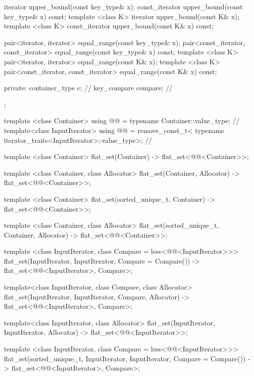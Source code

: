 \begin{codeblock}
\begin{codeblock}
\begin{codeblock}
\begin{addedblock}
\begin{codeblock}
{{    iterator upper_bound(const key_type& x);
    const_iterator upper_bound(const key_type& x) const;
    template <class K> iterator upper_bound(const K& x);
    template <class K> const_iterator upper_bound(const K& x) const;

    pair<iterator, iterator> equal_range(const key_type& x);
    pair<const_iterator, const_iterator> equal_range(const key_type& x) const;
    template <class K>
      pair<iterator, iterator> equal_range(const K& x);
    template <class K>
      pair<const_iterator, const_iterator> equal_range(const K& x) const;

  private:
      container_type c;    // \expos
      key_compare compare; // \expos
  };

  template <class Container>
    using @@ = typename Container::value_type; // \expos
  template<class InputIterator>
    using @@ = remove_const_t<
      typename iterator_traits<InputIterator>::value_type>;     // \expos

  template <class Container>
    flat_set(Container)
      -> flat_set<@@<Container>>;

  template <class Container, class Allocator>
    flat_set(Container, Allocator)
      -> flat_set<@@<Container>>;

  template <class Container>
    flat_set(sorted_unique_t, Container)
      -> flat_set<@@<Container>>;

  template <class Container, class Allocator>
    flat_set(sorted_unique_t, Container, Allocator)
      -> flat_set<@@<Container>>;

  template <class InputIterator, class Compare = less<@@<InputIterator>>>
    flat_set(InputIterator, InputIterator, Compare = Compare())
      -> flat_set<@@<InputIterator>, Compare>;

  template<class InputIterator, class Compare, class Allocator>
    flat_set(InputIterator, InputIterator, Compare, Allocator)
      -> flat_set<@@<InputIterator>, Compare>;

  template<class InputIterator, class Allocator>
    flat_set(InputIterator, InputIterator, Allocator)
      -> flat_set<@@<InputIterator>>;

  template <class InputIterator, class Compare = less<@@<InputIterator>>>
    flat_set(sorted_unique_t, InputIterator, InputIterator, Compare = Compare())
      -> flat_set<@@<InputIterator>, Compare>;

}
\end{codeblock}
\end{addedblock}
\end{codeblock}
\end{codeblock}
\end{codeblock}
